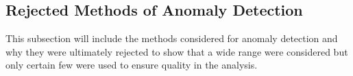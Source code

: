 
\subsection{Rejected Methods of Anomaly Detection}
This subsection will include the methods considered for anomaly detection and why they were ultimately rejected to show that a wide range were considered but only certain few were used to ensure quality in the analysis.
